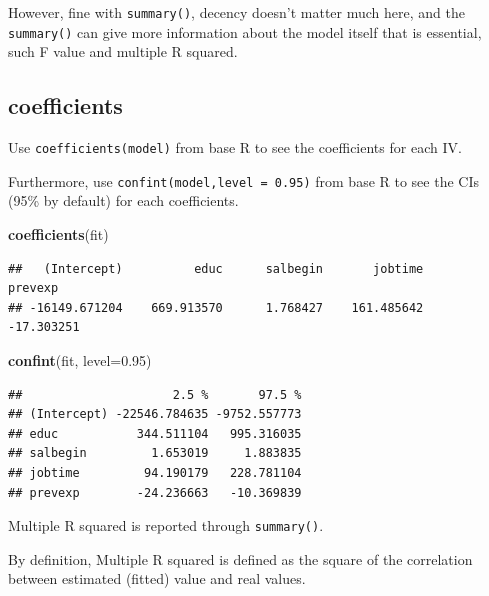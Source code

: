 \documentclass[
]{ctexart}
\newenvironment{Shaded}{\begin{snugshade}}{\end{snugshade}}
\newcommand{\AttributeTok}[1]{\textcolor[rgb]{0.13,0.29,0.53}{#1}}
\newcommand{\FloatTok}[1]{\textcolor[rgb]{0.00,0.00,0.81}{#1}}
\newcommand{\FunctionTok}[1]{\textcolor[rgb]{0.13,0.29,0.53}{\textbf{#1}}}
\newcommand{\NormalTok}[1]{#1}
\newcommand{\SpecialCharTok}[1]{\textcolor[rgb]{0.81,0.36,0.00}{\textbf{#1}}}
\begin{document}
However, fine with \texttt{summary()}, decency doesn't matter much here,
and the \texttt{summary()} can give more information about the model
itself that is essential, such F value and multiple R squared.

\hypertarget{coefficients}{%
\subsection{coefficients}\label{coefficients}}

Use \texttt{coefficients(model)} from base R to see the coefficients for
each IV.

Furthermore, use \texttt{confint(model,level\ =\ 0.95)} from base R to
see the CIs (95\% by default) for each coefficients.

\begin{Shaded}
\begin{Highlighting}[]
\FunctionTok{coefficients}\NormalTok{(fit)}
\end{Highlighting}
\end{Shaded}

\begin{verbatim}
##   (Intercept)          educ      salbegin       jobtime       prevexp 
## -16149.671204    669.913570      1.768427    161.485642    -17.303251
\end{verbatim}

\begin{Shaded}
\begin{Highlighting}[]
\FunctionTok{confint}\NormalTok{(fit, }\AttributeTok{level=}\FloatTok{0.95}\NormalTok{)}
\end{Highlighting}
\end{Shaded}

\begin{verbatim}
##                     2.5 %       97.5 %
## (Intercept) -22546.784635 -9752.557773
## educ           344.511104   995.316035
## salbegin         1.653019     1.883835
## jobtime         94.190179   228.781104
## prevexp        -24.236663   -10.369839
\end{verbatim}

Multiple R squared is reported through \texttt{summary()}.

By definition, Multiple R squared is defined as the square of the
correlation between estimated (fitted) value and real values.

\begin{Shaded}
\end{Shaded}
\end{document}
